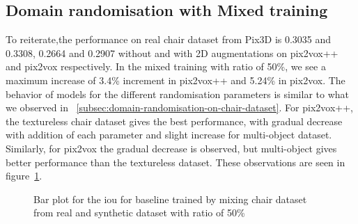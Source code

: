 \subsection{Domain randomisation with Mixed training}\label{subsec:domain-randomisation-with-mixed-training}

To reiterate,the performance on real chair dataset from Pix3D is 0.3035 and 0.3308, 0.2664 and 0.2907 without and with 2D augmentations on pix2vox++ and pix2vox respectively.
In the mixed training with ratio of 50\%, we see a maximum increase of 3.4\% increment in pix2vox++ and 5.24\% in pix2vox.
The behavior of models for the different randomisation parameters is similar to what we observed in ~\ref{subsec:domain-randomisation-on-chair-dataset}.
For pix2vox++, the textureless chair dataset gives the best performance, with gradual decrease with addition of each parameter and slight increase for multi-object dataset.
Similarly, for pix2vox the gradual decrease is observed, but multi-object gives better performance than the textureless dataset.
These observations are seen in figure~\ref{fig:ablation2}.

\begin{figure}
    \centering
    \resizebox{\textwidth}{!}{}
    \caption{Bar plot for the \gls{iou}  for baseline trained by mixing chair dataset from real and synthetic dataset with ratio of 50\%}
    \label{fig:ablation2}
\end{figure}
